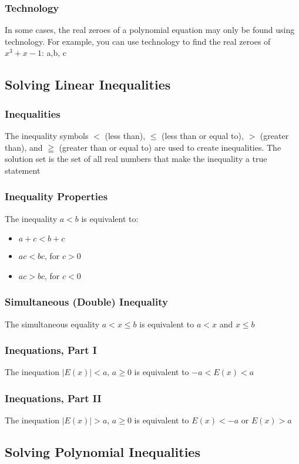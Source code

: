 \documentclass{article}
\begin{document}
	\subsubsection{Technology}
	In some cases, the real zeroes of a polynomial equation may only be found using technology. For example, you can use technology to find the real zeroes of $x^3+x-1$: a,b, c
	\subsection{Solving Linear Inequalities}
	\subsubsection{Inequalities}
	The inequality symbols $<$ (less than), $\leqslant$ (less than or equal to), $>$ (greater than), and $\geqq$ (greater than or equal to) are used to create inequalities. The solution set is the set of all real numbers that make the inequality a true statement
	\subsubsection{Inequality Properties}
	The inequality $a<b$ is equivalent to:
	\begin{itemize}
		\item $a+c<b+c$
		\item $ac<bc$, for $c>0$
		\item $ac>bc$, for $c<0$
	\end{itemize}
	\subsubsection{Simultaneous (Double) Inequality}
	The simultaneous equality $a<x\le b$ is equivalent to $a<x$ and $x\le b$
	\subsubsection{Inequations, Part I}
	The inequation $|E(x)|<a\text{, }a\ge0$ is equivalent to $-a<E(x)<a$
	\subsubsection{Inequations, Part II}
	The inequation $|E(x)|>a\text{, }a\ge0$ is equivalent to $E(x)<-a$ or $E(x)>a$
	\subsection{Solving Polynomial Inequalities}
\end{document}
